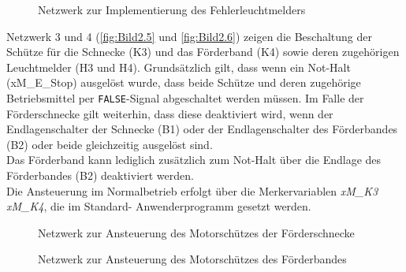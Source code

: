 \begin{figure}[H]
   \centering
   \caption[Fehlerleuchtmelder]{Netzwerk zur Implementierung des Fehlerleuchtmelders}
   \label{fig:Bild2.4}
\end{figure}

Netzwerk 3 und 4 (\autoref{fig:Bild2.5} und \autoref{fig:Bild2.6}) zeigen die Beschaltung der Schütze für die Schnecke (K3) und das Förderband (K4) sowie deren zugehörigen Leuchtmelder (H3 und H4). Grundsätzlich gilt, dass wenn ein Not-Halt (xM\_E\_Stop) ausgelöst wurde, dass beide Schütze und deren zugehörige Betriebsmittel per \texttt{FALSE}-Signal abgeschaltet werden müssen. Im Falle der Förderschnecke gilt weiterhin, dass diese deaktiviert wird, wenn der Endlagenschalter der Schnecke (B1) oder der Endlagenschalter des Förderbandes (B2) oder beide gleichzeitig ausgelöst sind. \\
Das Förderband kann lediglich zusätzlich zum Not-Halt über die Endlage des Förderbandes (B2) deaktiviert werden. \\
Die Ansteuerung im Normalbetrieb erfolgt über die Merkervariablen \textit{xM\_K3} \bzw \textit{xM\_K4}, die im Standard- Anwenderprogramm gesetzt werden.

\begin{figure}[H]
   \centering
   \caption[Motorschütz Förderschnecke]{Netzwerk zur Ansteuerung des Motorschützes der Förderschnecke}
   \label{fig:Bild2.5}
\end{figure}

\begin{figure}[H]
   \centering
   \caption[Motorschütz Förderband]{Netzwerk zur Ansteuerung des Motorschützes des Förderbandes}
   \label{fig:Bild2.6}
\end{figure}

